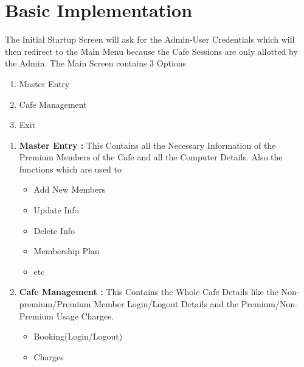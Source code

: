 \documentclass[12pt]{article}
\begin{document}
\section{Basic Implementation}
\vspace{2mm}
The Initial Startup Screen will ask for the Admin-User Credentials which will then redirect to the Main Menu because the Cafe Sessions are only allotted by the Admin.
\vspace{2mm}
The Main Screen contains 3 Options
\begin{enumerate}
    \item Master Entry
    \item Cafe Management
    \item Exit
\end{enumerate}
\begin{enumerate}
    \item \textbf{Master Entry :} This Contains all the Necessary Information of the Premium Members of the Cafe and all the Computer Details.
    Also the functions which are used to
    \begin{itemize}
    \item Add New Members
    \item Update Info
    \item Delete Info
    \item Membership Plan
    \item etc
    \end{itemize}
    \item \textbf{Cafe Management : }This Contains the Whole Cafe Details like  the Non-premium/Premium Member Login/Logout Details and the Premium/Non-Premium Usage Charges.
    \begin{itemize}
        \item Booking(Login/Logout)
        \item Charges
        
    \end{itemize}
    
    
\end{enumerate}

\newpage
\end{document}
